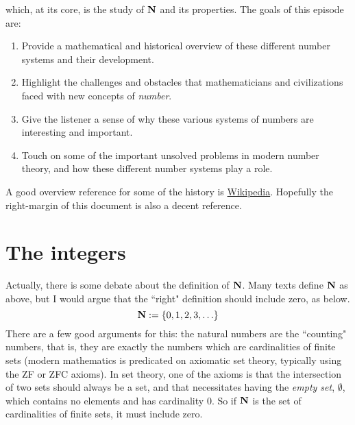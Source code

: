 \documentclass[11pt,oneside]{amsart}
\begin{document}
which, at its core, is the study of $\mathbf{N}$ and its properties.  
The goals of this episode are:
\begin{enumerate}
	\item Provide a mathematical and historical overview of these different number 
        systems and their development.
	\item Highlight the challenges and obstacles that mathematicians and 
        civilizations faced with new concepts of \emph{number}.
	\item Give the listener a sense of why these various systems of numbers are 
        interesting and important.
	\item Touch on some of the important unsolved problems in modern number 
        theory, and how these different number systems play a role.
\end{enumerate} 
A good overview reference for some of the history is 
  \href{https://en.wikipedia.org/wiki/Number}{Wikipedia}.
Hopefully the right-margin of this document is also a decent reference.

\section{The integers}
Actually, there is some debate about the definition of $\mathbf{N}$.  
Many texts define $\mathbf{N}$ as above, 
  but I would argue that the ``right" definition should include zero, as below.
\[\mathbf{N}:=\{0,1,2,3,\ldots\}\]
There are a few good arguments for this: 
  the natural numbers are the ``counting" numbers, 
  that is, they are exactly the numbers which
  are cardinalities of finite sets
  (modern mathematics is predicated on axiomatic set theory, 
  typically using the ZF or ZFC axioms).
In set theory, one of the axioms is that the intersection of two sets should 
  always be a set, and that necessitates having the {\em empty set}, 
  $\emptyset$,
  which contains no elements and has cardinality $0$.  
  So if $\mathbf{N}$ is the set of cardinalities of finite sets, it must include zero.
\end{document}

